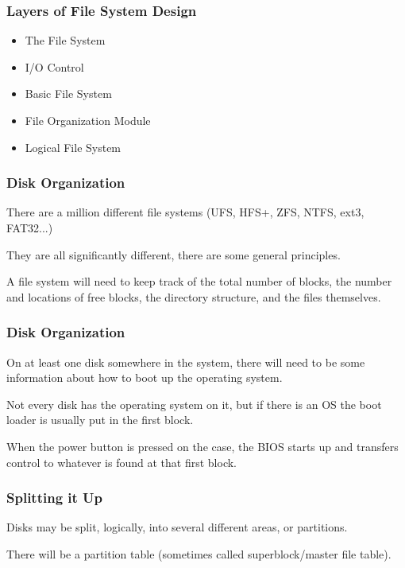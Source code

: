 \begin{frame}
\frametitle{Layers of File System Design}

\begin{itemize}
	\item The File System
	\item I/O Control
	\item Basic File System
	\item File Organization Module
	\item Logical File System
\end{itemize}

\end{frame}

\begin{frame}
\frametitle{Disk Organization}

There are a million different file systems (UFS, HFS+, ZFS, NTFS, ext3, FAT32...) 

They are all significantly different, there are some general principles. 

A file system will need to keep track of the total number of blocks, the number and locations of free blocks, the directory structure, and the files themselves.

\end{frame}

\begin{frame}
\frametitle{Disk Organization}

On at least one disk somewhere in the system, there will need to be some information about how to boot up the operating system. 

Not every disk has the operating system on it, but if there is an OS the boot loader is usually put in the first block. 

When the power button is pressed on the case, the BIOS starts up and transfers control to whatever is found at that first block.

\end{frame}

\begin{frame}
\frametitle{Splitting it Up}
Disks may be split, logically, into several different areas, or \alert{partitions}. 

There will be a partition table (sometimes called superblock/master file table).

\end{frame}

